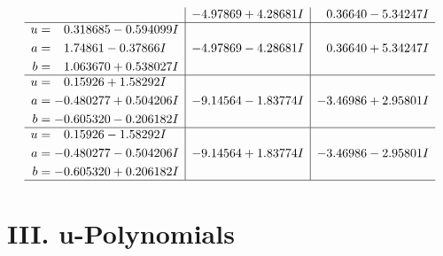 \documentclass[1p]{elsarticle_modified}
\theoremstyle{definition}
\begin{document}
$$\begin{array}{c|c|c}
 & -4.97869 + 4.28681 I & \phantom{-}0.36640 - 5.34247 I \\ \hline\begin{aligned}
u &= \phantom{-}0.318685 - 0.594099 I \\
a &= \phantom{-}1.74861 - 0.37866 I \\
b &= \phantom{-}1.063670 + 0.538027 I\end{aligned}
 & -4.97869 - 4.28681 I & \phantom{-}0.36640 + 5.34247 I \\ \hline\begin{aligned}
u &= \phantom{-}0.15926 + 1.58292 I \\
a &= -0.480277 + 0.504206 I \\
b &= -0.605320 - 0.206182 I\end{aligned}
 & -9.14564 - 1.83774 I & -3.46986 + 2.95801 I \\ \hline\begin{aligned}
u &= \phantom{-}0.15926 - 1.58292 I \\
a &= -0.480277 - 0.504206 I \\
b &= -0.605320 + 0.206182 I\end{aligned}
 & -9.14564 + 1.83774 I & -3.46986 - 2.95801 I\\
 \hline 
 \end{array}$$\newpage
\newpage\renewcommand{\arraystretch}{1}
\centering \section*{ III. u-Polynomials}
\end{document}
